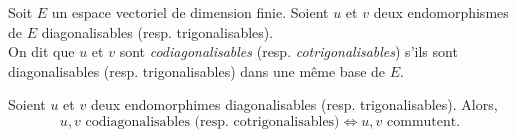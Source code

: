 \begin{defi}
    Soit $E$ un espace vectoriel de dimension finie. Soient $u$ et $v$ deux endomorphismes de $E$ diagonalisables (resp. trigonalisables). \\
    On dit que $u$ et $v$ sont \emph{codiagonalisables} (resp. \emph{cotrigonalisables}) s'ils sont diagonalisables (resp. trigonalisables) dans une même base de $E$.
\end{defi}

\begin{prop}
    Soient $u$ et $v$ deux endomorphimes diagonalisables (resp. trigonalisables). Alors, 
    $$u, v \text{ codiagonalisables (resp. cotrigonalisables)} \iff u, v \text{ commutent}.$$
\end{prop}

